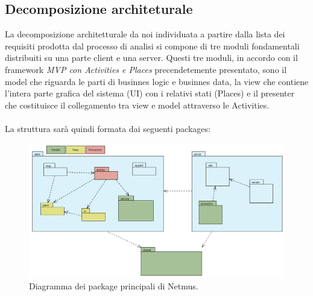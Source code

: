 \newpage
\subsection{Decomposizione architeturale}
La decomposizione architetturale da noi individuata a partire dalla lista dei
requisiti prodotta dal processo di analisi si compone di tre moduli
fondamentali distribuiti su una parte client e una server. Questi tre moduli, in
accordo con il framework \emph{MVP con Activities e Places} precendetemente
presentato, sono il model che riguarda le parti di businnes logic e businnes
data, la view che contiene l'intera parte grafica del sistema (UI) con i
relativi stati (Places) e il presenter che costituisce il collegamento tra view
e model attraverso le Activities.
\\\\
La struttura sar\`a quindi formata dai seguenti packages:
\begin{figure}[h]
  \centering
  \includegraphics[width=16cm]{img/ST/PackageGeneric.png}
\caption{Diagramma dei package principali di Netmus.}
\end{figure}

